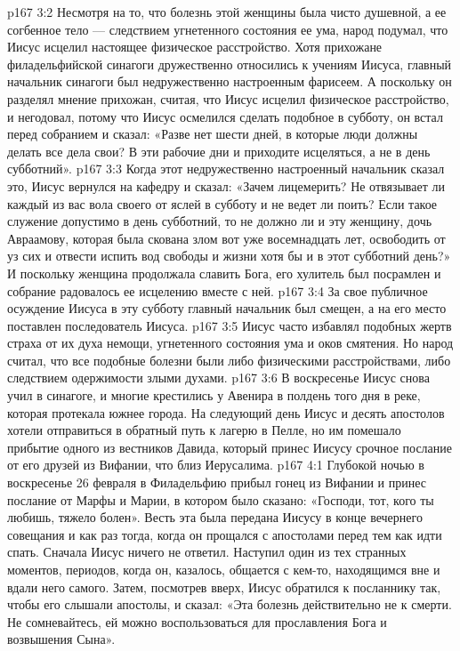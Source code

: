 \vs p167 3:2 Несмотря на то, что болезнь этой женщины была чисто душевной, а ее согбенное тело --- следствием угнетенного состояния ее ума, народ подумал, что Иисус исцелил настоящее физическое расстройство. Хотя прихожане филадельфийской синагоги дружественно относились к учениям Иисуса, главный начальник синагоги был недружественно настроенным фарисеем. А поскольку он разделял мнение прихожан, считая, что Иисус исцелил физическое расстройство, и негодовал, потому что Иисус осмелился сделать подобное в субботу, он встал перед собранием и сказал: «Разве нет шести дней, в которые люди должны делать все дела свои? В эти рабочие дни и приходите исцеляться, а не в день субботний».
\vs p167 3:3 Когда этот недружественно настроенный начальник сказал это, Иисус вернулся на кафедру и сказал: «Зачем лицемерить? Не отвязывает ли каждый из вас вола своего от яслей в субботу и не ведет ли поить? Если такое служение допустимо в день субботний, то не должно ли и эту женщину, дочь Авраамову, которая была скована злом вот уже восемнадцать лет, освободить от уз сих и отвести испить вод свободы и жизни хотя бы и в этот субботний день?» И поскольку женщина продолжала славить Бога, его хулитель был посрамлен и собрание радовалось ее исцелению вместе с ней.
\vs p167 3:4 За свое публичное осуждение Иисуса в эту субботу главный начальник был смещен, а на его место поставлен последователь Иисуса.
\vs p167 3:5 \pc Иисус часто избавлял подобных жертв страха от их духа немощи, угнетенного состояния ума и оков смятения. Но народ считал, что все подобные болезни были либо физическими расстройствами, либо следствием одержимости злыми духами.
\vs p167 3:6 \pc В воскресенье Иисус снова учил в синагоге, и многие крестились у Авенира в полдень того дня в реке, которая протекала южнее города. На следующий день Иисус и десять апостолов хотели отправиться в обратный путь к лагерю в Пелле, но им помешало прибытие одного из вестников Давида, который принес Иисусу срочное послание от его друзей из Вифании, что близ Иерусалима.
\vs p167 4:1 Глубокой ночью в воскресенье 26 февраля в Филадельфию прибыл гонец из Вифании и принес послание от Марфы и Марии, в котором было сказано: «Господи, тот, кого ты любишь, тяжело болен». Весть эта была передана Иисусу в конце вечернего совещания и как раз тогда, когда он прощался с апостолами перед тем как идти спать. Сначала Иисус ничего не ответил. Наступил один из тех странных моментов, периодов, когда он, казалось, общается с кем\hyp{}то, находящимся вне и вдали него самого. Затем, посмотрев вверх, Иисус обратился к посланнику так, чтобы его слышали апостолы, и сказал: «Эта болезнь действительно не к смерти. Не сомневайтесь, ей можно воспользоваться для прославления Бога и возвышения Сына».
